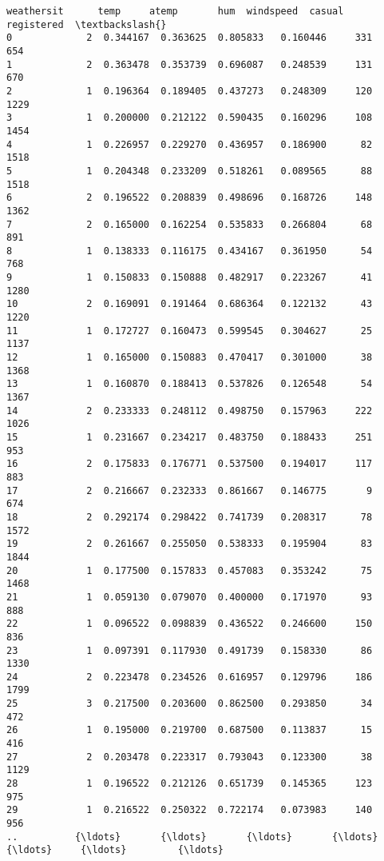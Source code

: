 \documentclass[11pt]{article}
\begin{document}
\begin{Verbatim}[commandchars=\\\{\}]
     weathersit      temp     atemp       hum  windspeed  casual  registered  \textbackslash{}
0             2  0.344167  0.363625  0.805833   0.160446     331         654   
1             2  0.363478  0.353739  0.696087   0.248539     131         670   
2             1  0.196364  0.189405  0.437273   0.248309     120        1229   
3             1  0.200000  0.212122  0.590435   0.160296     108        1454   
4             1  0.226957  0.229270  0.436957   0.186900      82        1518   
5             1  0.204348  0.233209  0.518261   0.089565      88        1518   
6             2  0.196522  0.208839  0.498696   0.168726     148        1362   
7             2  0.165000  0.162254  0.535833   0.266804      68         891   
8             1  0.138333  0.116175  0.434167   0.361950      54         768   
9             1  0.150833  0.150888  0.482917   0.223267      41        1280   
10            2  0.169091  0.191464  0.686364   0.122132      43        1220   
11            1  0.172727  0.160473  0.599545   0.304627      25        1137   
12            1  0.165000  0.150883  0.470417   0.301000      38        1368   
13            1  0.160870  0.188413  0.537826   0.126548      54        1367   
14            2  0.233333  0.248112  0.498750   0.157963     222        1026   
15            1  0.231667  0.234217  0.483750   0.188433     251         953   
16            2  0.175833  0.176771  0.537500   0.194017     117         883   
17            2  0.216667  0.232333  0.861667   0.146775       9         674   
18            2  0.292174  0.298422  0.741739   0.208317      78        1572   
19            2  0.261667  0.255050  0.538333   0.195904      83        1844   
20            1  0.177500  0.157833  0.457083   0.353242      75        1468   
21            1  0.059130  0.079070  0.400000   0.171970      93         888   
22            1  0.096522  0.098839  0.436522   0.246600     150         836   
23            1  0.097391  0.117930  0.491739   0.158330      86        1330   
24            2  0.223478  0.234526  0.616957   0.129796     186        1799   
25            3  0.217500  0.203600  0.862500   0.293850      34         472   
26            1  0.195000  0.219700  0.687500   0.113837      15         416   
27            2  0.203478  0.223317  0.793043   0.123300      38        1129   
28            1  0.196522  0.212126  0.651739   0.145365     123         975   
29            1  0.216522  0.250322  0.722174   0.073983     140         956   
..          {\ldots}       {\ldots}       {\ldots}       {\ldots}        {\ldots}     {\ldots}         {\ldots}   

\end{Verbatim}
\end{document}
